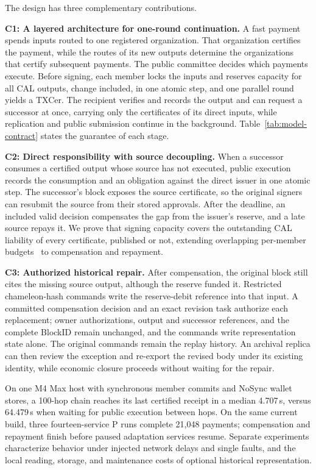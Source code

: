 The design has three complementary contributions.

\noindent\textbf{C1: A layered architecture for one-round continuation.}
A fast payment spends inputs routed to one registered organization.
That organization certifies the payment, while the routes of its new
outputs determine the organizations that certify subsequent payments.
The public committee decides which payments execute.
Before signing, each member locks the inputs and reserves capacity for all CAL
outputs, change included, in one atomic step, and one parallel round yields
a TXCer. The recipient verifies and records the output and can request a
successor at once, carrying only the certificates of its direct inputs,
while replication and public submission continue in the background.
Table~\ref{tab:model-contract} states the guarantee of each stage.

\noindent\textbf{C2: Direct responsibility with source decoupling.} When a successor
consumes a certified output whose source has not executed, public execution
records the consumption and an obligation against the direct issuer in one
atomic step. The successor's block exposes the source certificate, so the
original signers can resubmit the source from their stored approvals. After
the deadline, an included valid decision compensates the gap from the issuer's
reserve, and a late source repays it. We prove that signing capacity covers
the outstanding CAL liability of every certificate, published or not,
extending overlapping per-member budgets~\cite{stingray} to compensation
and repayment.

\noindent\textbf{C3: Authorized historical repair.} After compensation, the original
block still cites the missing source output, although the reserve funded
it. Restricted chameleon-hash commands write the reserve-debit reference
into that input. A committed compensation decision and an exact revision
task authorize each replacement; owner authorizations, output and successor
references, and the complete BlockID remain unchanged, and the commands
write representation state alone. The original commands remain the replay
history. An archival replica can then review the exception and re-export
the revised body under its existing identity, while economic closure
proceeds without waiting for the repair.

On one M4 Max host with synchronous member commits and NoSync wallet
stores, a 100-hop chain reaches its last certified receipt in a median
4.707\,s, versus 64.479\,s when waiting for public execution between
hops. On the same current build, three fourteen-service P runs complete
21,048 payments; compensation and repayment finish before paused
adaptation services resume. Separate experiments characterize behavior
under injected network delays and single faults, and the local reading,
storage, and maintenance costs of optional historical representation.
